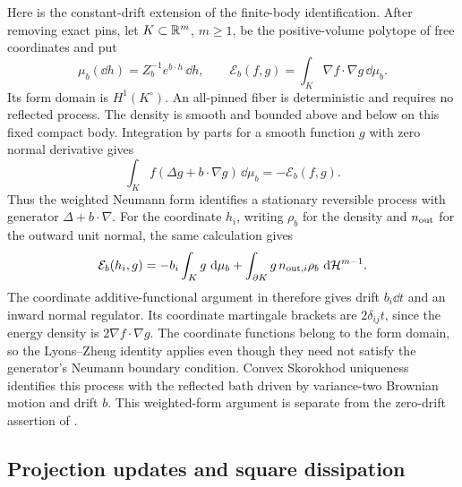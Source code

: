 Here is the constant-drift extension of the finite-body identification.
After removing exact pins, let $K\subset\mathbb R^m$, $m\ge1$, be the
positive-volume polytope of free coordinates and put
\[
 \mu_b(\dd h)=Z_b^{-1}e^{b\cdot h}\,\dd h,
 \qquad \mathcal E_b(f,g)=\int_K\nabla f\cdot\nabla g\,\dd\mu_b.
\]
Its form domain is $H^1(K^\circ)$. An all-pinned fiber is deterministic
and requires no reflected process.
The density is smooth and bounded above and below on this fixed compact
body. Integration by parts for a smooth function $g$ with zero normal
derivative gives
\[
 \int_K f(\Delta g+b\cdot\nabla g)\,\dd\mu_b
       =-\mathcal E_b(f,g).
\]
Thus the weighted Neumann form identifies a stationary reversible
process with generator $\Delta+b\cdot\nabla$. For the coordinate $h_i$,
writing $\rho_b$ for the density and $n_{\rm out}$ for the outward unit
normal, the same calculation gives
\[
 \mathcal E_b(h_i,g)
 =-b_i\int_K g\,\,\mathrm d\mu_b
  +\int_{\partial K}g\,n_{{\rm out},i}\rho_b\,\,\mathrm d\mathcal H^{m-1}.
\]
The coordinate additive-functional argument in \cite{BassHsu} therefore
gives drift $b_i\dd t$ and an inward normal regulator. Its coordinate
martingale brackets are $2\delta_{ij}t$, since the energy density is
$2\nabla f\cdot\nabla g$. The coordinate functions belong to the form
domain, so the Lyons--Zheng identity applies even though they need not
satisfy the generator's Neumann boundary condition. Convex Skorokhod
uniqueness identifies this process with the reflected bath driven by
variance-two Brownian motion and drift $b$. This weighted-form argument
is separate from the zero-drift assertion of \cite{BassHsu}.

\subsection{Projection updates and square dissipation}

